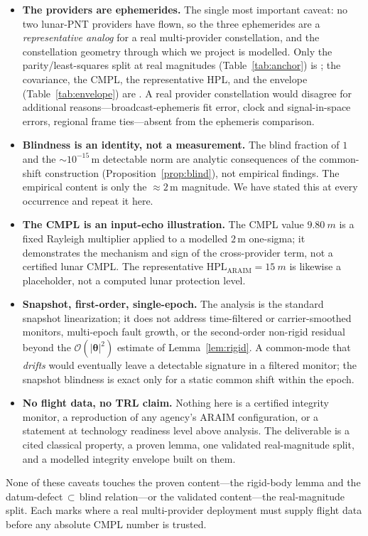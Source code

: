 \begin{itemize}
  \item \textbf{The providers are ephemerides.} The single most important caveat: no two
  lunar-PNT providers have flown, so the three ephemerides are a \emph{representative
  analog} for a real multi-provider constellation, and the constellation geometry through
  which we project is modelled. Only the parity/least-squares split at real magnitudes
  (Table~\ref{tab:anchor}) is \Validated{}; the covariance, the CMPL, the representative
  HPL, and the envelope (Table~\ref{tab:envelope}) are \Modelled{}. A real provider
  constellation would disagree for additional reasons---broadcast-ephemeris fit error,
  clock and signal-in-space errors, regional frame ties---absent from the ephemeris
  comparison.

  \item \textbf{Blindness is an identity, not a measurement.} The blind fraction of $1$
  and the $\sim\!10^{-15}\,$m detectable norm are analytic consequences of the
  common-shift construction (Proposition~\ref{prop:blind}), not empirical findings. The
  empirical content is only the $\approx\!2\,$m magnitude. We have stated this at every
  occurrence and repeat it here.

  \item \textbf{The CMPL is an input-echo illustration.} The CMPL value $\SI{9.80}{m}$ is
  a fixed Rayleigh multiplier applied to a modelled $2\,$m one-sigma; it demonstrates the
  mechanism and sign of the cross-provider term, not a certified lunar CMPL. The
  representative $\mathrm{HPL}_{\mathrm{ARAIM}}=\SI{15}{m}$ is likewise a placeholder, not
  a computed lunar protection level.

  \item \textbf{Snapshot, first-order, single-epoch.} The analysis is the standard
  snapshot linearization; it does not address time-filtered or carrier-smoothed
  monitors, multi-epoch fault growth, or the second-order non-rigid residual beyond the
  $\mathcal{O}(|\bm\theta|^2)$ estimate of Lemma~\ref{lem:rigid}. A common-mode that
  \emph{drifts} would eventually leave a detectable signature in a filtered monitor; the
  snapshot blindness is exact only for a static common shift within the epoch.

  \item \textbf{No flight data, no TRL claim.} Nothing here is a certified integrity
  monitor, a reproduction of any agency's ARAIM configuration, or a statement at
  technology readiness level above analysis. The deliverable is a cited classical
  property, a proven lemma, one validated real-magnitude split, and a modelled integrity
  envelope built on them.
\end{itemize}

None of these caveats touches the proven content---the rigid-body lemma and the
datum-defect$\,\subset\,$blind relation---or the validated content---the real-magnitude
split. Each marks where a real multi-provider deployment must supply flight data before
any absolute CMPL number is trusted.

